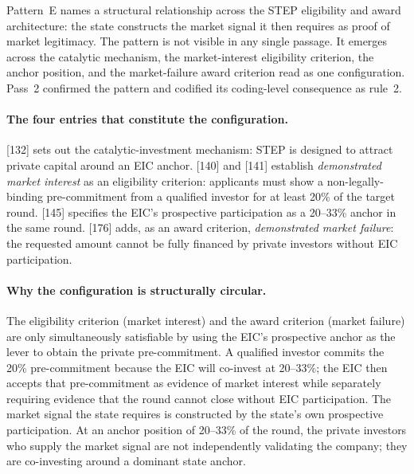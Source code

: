 Pattern~E names a structural relationship across the STEP eligibility
and award architecture: the state constructs the market signal it
then requires as proof of market legitimacy. The pattern is not
visible in any single passage. It emerges across the catalytic
mechanism, the market-interest eligibility criterion, the anchor
position, and the market-failure award criterion read as one
configuration. Pass~2 confirmed the pattern and codified its
coding-level consequence as rule~2.

\paragraph{The four entries that constitute the configuration.}
[132] sets out the catalytic-investment mechanism: STEP is designed
to attract private capital around an EIC anchor. [140] and [141]
establish \emph{demonstrated market interest} as an eligibility
criterion: applicants must show a non-legally-binding pre-commitment
from a qualified investor for at least 20\% of the target round.
[145] specifies the EIC's prospective participation as a 20--33\%
anchor in the same round. [176] adds, as an award criterion,
\emph{demonstrated market failure}: the requested amount cannot be
fully financed by private investors without EIC participation.

\paragraph{Why the configuration is structurally circular.}
The eligibility criterion (market interest) and the award criterion
(market failure) are only simultaneously satisfiable by using the
EIC's prospective anchor as the lever to obtain the private
pre-commitment. A qualified investor commits the 20\% pre-commitment
because the EIC will co-invest at 20--33\%; the EIC then accepts that
pre-commitment as evidence of market interest while separately
requiring evidence that the round cannot close without EIC
participation. The market signal the state requires is constructed by
the state's own prospective participation. At an anchor position of
20--33\% of the round, the private investors who supply the market
signal are not independently validating the company; they are
co-investing around a dominant state anchor.


